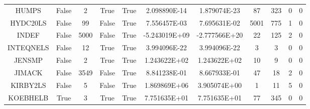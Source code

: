 \begin{longtable}{ccccccccccc}
	\cellcolor{default2} HUMPS& \cellcolor{default2} False& \cellcolor{default2} 2& \cellcolor{default2} True& \cellcolor{default2} True& \cellcolor{ok} 2.098890E-14& \cellcolor{best} 1.879074E-23& \cellcolor{best} 87& \cellcolor{poor} 323& \cellcolor{default2} 0& \cellcolor{default2} 0\\
	\cellcolor{default1} HYDC20LS& \cellcolor{default1} False& \cellcolor{default1} 99& \cellcolor{default1} False& \cellcolor{default1} True& \cellcolor{best} 7.556457E-03& \cellcolor{poor} 7.695631E-02& \cellcolor{poor} 5001& \cellcolor{best} 775& \cellcolor{default1} 1& \cellcolor{default1} 0\\
	\cellcolor{default2} INDEF& \cellcolor{default2} False& \cellcolor{default2} 5000& \cellcolor{default2} False& \cellcolor{default2} True& \cellcolor{poor} -5.243019E+09& \cellcolor{best} -2.777566E+20& \cellcolor{best} 22& \cellcolor{poor} 125& \cellcolor{default2} 2& \cellcolor{default2} 0\\
	\cellcolor{default1} INTEQNELS& \cellcolor{default1} False& \cellcolor{default1} 12& \cellcolor{default1} True& \cellcolor{default1} True& \cellcolor{best} 3.994096E-22& \cellcolor{ok} 3.994096E-22& \cellcolor{best} 3& \cellcolor{best} 3& \cellcolor{default1} 0& \cellcolor{default1} 0\\
	\cellcolor{default2} JENSMP& \cellcolor{default2} False& \cellcolor{default2} 2& \cellcolor{default2} True& \cellcolor{default2} True& \cellcolor{best} 1.243622E+02& \cellcolor{ok} 1.243622E+02& \cellcolor{ok} 10& \cellcolor{best} 9& \cellcolor{default2} 0& \cellcolor{default2} 0\\
	\cellcolor{default1} JIMACK& \cellcolor{default1} False& \cellcolor{default1} 3549& \cellcolor{default1} False& \cellcolor{default1} True& \cellcolor{poor} 8.841238E-01& \cellcolor{best} 8.667933E-01& \cellcolor{poor} 47& \cellcolor{best} 18& \cellcolor{default1} 2& \cellcolor{default1} 0\\
	\cellcolor{default2} KIRBY2LS& \cellcolor{default2} False& \cellcolor{default2} 5& \cellcolor{default2} False& \cellcolor{default2} True& \cellcolor{poor} 1.869869E+06& \cellcolor{best} 3.905074E+00& \cellcolor{best} 1& \cellcolor{poor} 11& \cellcolor{default2} 5& \cellcolor{default2} 0\\
	\cellcolor{default1} KOEBHELB& \cellcolor{default1} True& \cellcolor{default1} 3& \cellcolor{default1} True& \cellcolor{default1} True& \cellcolor{best} 7.751635E+01& \cellcolor{ok} 7.751635E+01& \cellcolor{best} 77& \cellcolor{poor} 345& \cellcolor{default1} 0& \cellcolor{default1} 0\\

\end{longtable}
